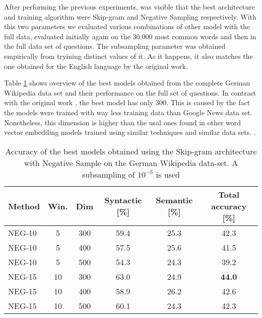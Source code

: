 After performing the previous experiments, was visible that the best
architecture and training algorithm were Skip-gram and Negative Sampling
respectively. With this two parameters we evaluated various combinations of
other model with the full data, evaluated initially again on the 30.000 most
common words  and then in the full data set of questions. The subsampling
parameter was obtained empirically from tryining distinct values of it. As it
happens, it also matches the one obtained for the English language by the original work.

Table \ref{tab:main_results} shows  overview of the best models obtained from
the complete German Wikipedia data set  and their performance on the full set
of questions. In contrast with the original work
\cite{MikolovSCCD13} \cite{DBLP:journals/corr/abs-1301-3781} , the best model
has only 300. This is caused by the fact the models were trained with way
less training data than Google News data set. Nonetheless, this dimension is
higher than the usal ones found in other word vector embedding models
trained using similar techniques and similar data
sets.\cite{Turian:2010:WRS:1858681.1858721} \cite{DBLP:journals/corr/abs-1103-0398}.

\begin{table}[h]
\centering
\small
\caption{Accuracy of the best models obtained using the Skip-gram
  architecture with Negative Sample on the German Wikipedia data-set. A
  subsampling of $10^{-5}$ is used} 
\label{tab:main_results}



\begin{tabular}{|l|c|c|cc|c|}
\hline
Method  &  Win.  &  Dim   &  Syntactic [\%] & Semantic
[\%] &  Total accuracy [\%]  \\
\hline

NEG-10  &   5  &  300  &  59.4  &  25.3  &  42.3  \\
 NEG-10  &   5  &  400  &  57.5  &  25.6  &  41.5  \\
 NEG-10  &   5  &  500  &  54.3  &  24.3  &  39.2  \\
 NEG-15  &  10  &  300  &  63.0  &  24.9  &  \textbf{44.0}  \\
 NEG-15  &  10  &  400  &  58.9  &  26.2  &  42.6  \\
 NEG-15  &  10  &  500  &  60.1  &  24.3  &  42.3  \\
\hline
\end{tabular}


\end{table}






